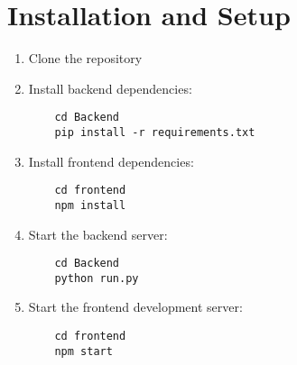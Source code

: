 \documentclass[12pt,a4paper]{article}
\begin{document}
\section{Installation and Setup}
\begin{enumerate}
    \item Clone the repository
    \item Install backend dependencies:
    \begin{lstlisting}
    cd Backend
    pip install -r requirements.txt
    \end{lstlisting}
    \item Install frontend dependencies:
    \begin{lstlisting}
    cd frontend
    npm install
    \end{lstlisting}
    \item Start the backend server:
    \begin{lstlisting}
    cd Backend
    python run.py
    \end{lstlisting}
    \item Start the frontend development server:
    \begin{lstlisting}
    cd frontend
    npm start
    \end{lstlisting}
\end{enumerate}
\end{document}
